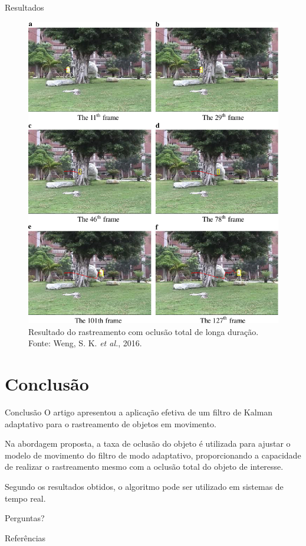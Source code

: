 \documentclass[10pt]{beamer}
\begin{document}
\begin{frame}{Resultados}
\begin{figure}[H]
	\label{fig:long}
	\includegraphics[scale=0.45]{images/result-long.pdf}
	\caption{Resultado do rastreamento com oclusão total de longa duração. Fonte: Weng, S. K. \textit{et al.}, 2016.}
\end{figure}
\end{frame}

\section{Conclusão}

\begin{frame}{Conclusão}
O artigo apresentou a aplicação efetiva de um filtro de Kalman adaptativo para o rastreamento de objetos em movimento.

Na abordagem proposta, a taxa de oclusão do objeto é utilizada para ajustar o modelo de movimento do filtro de modo adaptativo, proporcionando a capacidade de realizar o rastreamento mesmo com a oclusão total do objeto de interesse.

Segundo os resultados obtidos, o algoritmo pode ser utilizado em sistemas de tempo real.

\end{frame}

\begin{frame}[standout]
	Perguntas?
\end{frame}

\appendix

\begin{frame}[allowframebreaks]{Referências}

  
  

\end{frame}
\end{document}
